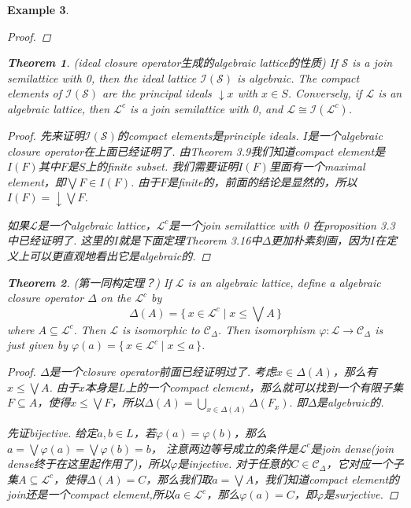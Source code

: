 \documentclass{article}
\newtheorem{theorem}{Theorem}[section]
\newtheorem{example}[theorem]{Example}
\newcommand*{\xfunc}[4]{{#2}\colon{#3}{#1}{#4}}
\newcommand*{\func}[3]{\xfunc{\to}{#1}{#2}{#3}}
\newcommand\Set[2]{\{\,#1\mid#2\,\}} %
\newcommand\slattice{\mathcal{S}}
\newcommand\lattice{\mathcal{L}}
\begin{document}
\begin{example}
\begin{proof}
\end{proof}

\begin{theorem}
\rm {\color{red} (ideal closure operator生成的algebraic lattice的性质)} If $\slattice$ is a join semilattice with 0, then the ideal lattice $\mathcal{I}(\mathcal{S})$ is algebraic. The {\color{red} compact elements of $\mathcal{I}(\mathcal{S})$ are the principal ideals} $\downarrow x$ with $x \in S$. Conversely, if $\lattice$ is an algebraic lattice, then $\lattice^c$ is a join semilattice with 0, and $\lattice \cong \mathcal{I}(\lattice ^ c)$.
\end{theorem}

\begin{proof}
先来证明$\mathcal{I}(\slattice)$的compact elements是principle ideals. $I$是一个algebraic closure operator在上面已经证明了. 由Theorem 3.9我们知道compact element是$I(F)$其中$F$是$S$上的finite subset. 我们需要证明$I(F)$里面有一个maximal element，即$\bigvee F \in I(F)$. 由于$F$是finite的，前面的结论是显然的，所以$I(F) = \downarrow \bigvee F$.

如果$\lattice$是一个algebraic lattice，$\lattice^c$是一个join semilattice with 0 在proposition 3.3中已经证明了. 这里的$I$就是下面定理Theorem 3.16中$\Delta$更加朴素刻画，因为$I$在定义上可以更直观地看出它是algebraic的.

\end{proof}

\begin{theorem}
\rm {\color{red}(第一同构定理？)} If $\lattice$ is an algebraic lattice, define a algebraic closure operator $\Delta$ on the $\lattice^c$ by
$$
	\Delta(A) = \Set{x \in \lattice^c}{x \leq \bigvee A}
$$ 
where $A \subseteq \lattice^c$. Then $\lattice$ is isomorphic to $\mathcal{C}_\Delta$. Then isomorphism $\func{\varphi}{\lattice}{\mathcal{C}_\Delta}$ is just given by $\varphi(a) = \Set{x \in \lattice^c}{x \leq a}$.
\end{theorem}

\begin{proof}
$\Delta$是一个closure operator前面已经证明过了. 考虑$x \in \Delta(A)$，那么有$x \leq \bigvee A$. 由于$x$本身是$L$上的一个compact element，那么就可以找到一个有限子集$F \subseteq A$，使得$x \leq \bigvee F$，所以$\Delta(A) = \bigcup\limits_{x \in \Delta(A)} \Delta(F_x).$ 即$\Delta$是algebraic的.

先证bijective. 给定$a,b \in L$，若$\varphi(a) = \varphi(b)$，那么$a = \bigvee \varphi(a) = \bigvee \varphi(b) = b$，{\color{red} 注意两边等号成立的条件是$\lattice^c$是join dense(join dense终于在这里起作用了)}，所以$\varphi$是injective. 对于任意的$C \in \mathcal{C}_\Delta$，它对应一个子集$A \subseteq \lattice^c$，使得$\Delta(A) = C$，那么我们取$a = \bigvee A$，我们知道compact element的join还是一个compact element,所以$a \in \lattice^c$，那么$\varphi(a) = C$，即$\varphi$是surjective.


\end{proof}
\end{example}
\end{document}
